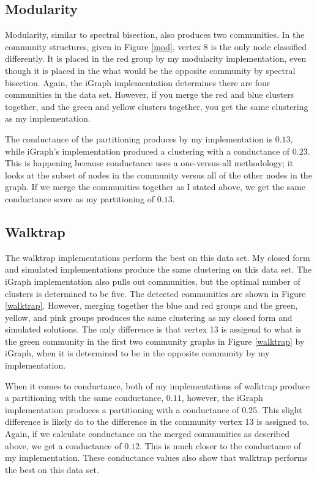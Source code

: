 \documentclass{article}
\begin{document}
    \subsection{Modularity}
    Modularity, similar to spectral bisection, also produces two communities. In the community structures, given in Figure \ref{mod}, vertex 8 is the only node classified differently. It is placed in the red group by my modularity implementation, even though it is placed in the what would be the opposite community by spectral bisection. Again, the iGraph implementation determines there are four communities in the data set. However, if you merge the red and blue clusters together, and the green and yellow clusters together, you get the same clustering as my implementation.
    \par
    The conductance of the partitioning produces by my implementation is $0.13$, while iGraph's implementation produced a clustering with a conductance of $0.23$. This is happening because conductance uses a one-versus-all methodology; it looks at the subset of nodes in the community versus all of the other nodes in the graph. If we merge the communities together as I stated above, we get the same conductance score as my partitioning of $0.13$.

    \subsection{Walktrap}
    The walktrap implementations perform the best on this data set. My closed form and simulated implementations produce the same clustering on this data set. The iGraph implementation also pulls out communities, but the optimal number of clusters is determined to be five. The detected communities are shown in Figure \ref{walktrap}. However, merging together the blue and red groups and the green, yellow, and pink groups produces the same clustering as my closed form and simulated solutions. The only difference is that vertex 13 is assigend to what is the green community in the first two community graphs in Figure \ref{walktrap} by iGraph, when it is determined to be in the opposite community by my implementation.
    \par
    When it comes to conductance, both of my implementations of walktrap produce a partitioning with the same conductance, $0.11$, however, the iGraph implementation produces a partitioning with a conductance of $0.25$. This slight difference is likely do to the difference in the community vertex 13 is assigned to. Again, if we calculate conductance on the merged communities as described above, we get a conductance of $0.12$. This is much closer to the conductance of my implementation. These conductance values also show that walktrap performs the best on this data set.
\end{document}
